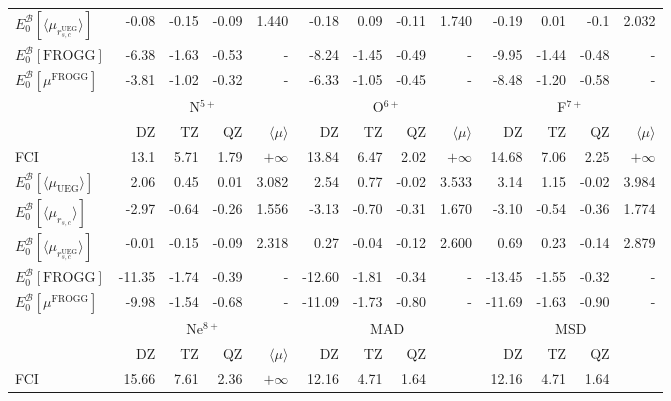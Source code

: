 \documentclass[aip,jcp,reprint,noshowkeys,superscriptaddress]{revtex4-1}
\newcommand{\frogg}[0]{\text{FROGG}}
\newcommand{\mfrogg}[0]{\mu^\text{FROGG}}
\newcommand{\basis}[0]{\mathcal{B}}
\newcommand{\muuegav}{\langle \mu_{\text{UEG}}\rangle}
\newcommand{\muav}{\langle \mu\rangle}
\newcommand{\murscav}{\langle \mu_{r_{s,c}}\rangle}
\newcommand{\mursclda}{\langle \mu_{r_{s,c}^{\text{UEG}}}\rangle}
\begin{document}
\begin{table}
\begin{ruledtabular}
\begin{tabular}{l|rrr|r||rrr|r||rrr|r|}
$E_0^{\basis}[\mursclda]$&  -0.08  &  -0.15   & -0.09   &1.440     &  -0.18  &   0.09   &  -0.11  &1.740     &  -0.19  &   0.01   &  -0.1  &2.032        \\  
$E_0^{\basis}[\frogg]$   &  -6.38  &  -1.63   & -0.53   &   -      &  -8.24  &  -1.45   &  -0.49  &    -     &  -9.95  &  -1.44   &  -0.48 &     -       \\
$E_0^{\basis}[\mfrogg]$  &  -3.81  &  -1.02   & -0.32   &   -      &  -6.33  &  -1.05   &  -0.45  &    -     &  -8.48  &  -1.20   &  -0.58 &     -       \\
\hline              
                         &\multicolumn{4}{c}{N$^{5+}$}   & \multicolumn{4}{c}{O$^{6+}$}            & \multicolumn{4}{c}{F$^{7+}$}    \\
                         &   DZ    &  TZ      &   QZ     & $\muav$ &  DZ     &   TZ    &  QZ     & $\muav$&   DZ    &   TZ     &  QZ    & $\muav$  \\
\hline              
 FCI                     &  13.1   &   5.71   &  1.79    &$+\infty$  &  13.84  &   6.47  &  2.02   &$+\infty$ &  14.68  &   7.06   &  2.25   &$+\infty$   \\  
$E_0^{\basis}[\muuegav]$ &  2.06   &   0.45   &  0.01    &3.082      &  2.54   &   0.77  & -0.02   &3.533     &  3.14   &   1.15   & -0.02   &3.984       \\  
$E_0^{\basis}[\murscav]$ &  -2.97  &  -0.64   &  -0.26   &1.556      & -3.13   &  -0.70  & -0.31   &1.670     & -3.10   &  -0.54   & -0.36   &1.774       \\  
$E_0^{\basis}[\mursclda]$&  -0.01  &  -0.15   &  -0.09   &2.318      &  0.27   &  -0.04  & -0.12   &2.600     &  0.69   &   0.23   & -0.14   &2.879       \\  
$E_0^{\basis}[\frogg]$   &  -11.35 &  -1.74   &  -0.39   &    -      & -12.60  &  -1.81  & -0.34   &   -      & -13.45  &  -1.55   & -0.32   &    - \\
$E_0^{\basis}[\mfrogg]$  &   -9.98 &  -1.54   &  -0.68   &    -      & -11.09  &  -1.73  & -0.80   &   -      & -11.69  &  -1.63   & -0.90   &    - \\
\hline              
                         &\multicolumn{4}{c}{Ne$^{8+}$}  & \multicolumn{4}{c}{MAD} & \multicolumn{4}{c}{MSD}    \\
                         &   DZ    &  TZ      &   QZ     & $\muav$ &  DZ     &   TZ     &  QZ     &          &   DZ    &   TZ     &  QZ    &         \\
\hline              
 FCI                     &  15.66  &   7.61   &  2.36    &$+\infty$  & 12.16   &    4.71  &    1.64 &          &  12.16   &   4.71   &    1.64&      \\   

\end{tabular}
\end{ruledtabular}
\end{table}
\end{document}
